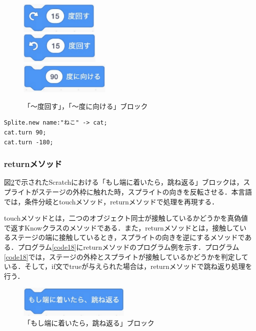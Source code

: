 \documentclass[10pt,a4j]{ltjsarticle}
\begin{document}
\begin{figure}[H]
  \centering
  \includegraphics[height=15mm]{images/turn_right.pdf} \\
  \includegraphics[height=15mm]{images/turn_left.pdf} \\
  \includegraphics[height=15mm]{images/turn.pdf}
  \caption{「〜度回す」，「〜度に向ける」ブロック}
  \label{fig:turn}
\end{figure}

\begin{lstlisting}[caption=turnメソッドのプログラム例, label=code17]
Splite.new name:"ねこ" -> cat;
cat.turn 90;
cat.turn -180; 
\end{lstlisting}

\subsubsection{returnメソッド}
図\ref{fig:return}で示されたScratchにおける「もし端に着いたら，跳ね返る」ブロックは，スプライトがステージの外枠に触れた時，スプライトの向きを反転させる．本言語では，条件分岐とtouchメソッド，returnメソッドで処理を再現する．

touchメソッドとは，二つのオブジェクト同士が接触しているかどうかを真偽値で返すKnowクラスのメソッドである．また，returnメソッドとは，接触しているステージの端に接触しているとき，スプライトの向きを逆にするメソッドである．プログラム\ref{code18}にreturnメソッドのプログラム例を示す．プログラム\ref{code18}では，ステージの外枠とスプライトが接触しているかどうかを判定している．そして，if文でtrueが与えられた場合は，returnメソッドで跳ね返り処理を行う．

\begin{figure}[H]
  \centering
  \includegraphics[height=15mm]{images/return.pdf}
  \caption{「もし端に着いたら，跳ね返る」ブロック}
  \label{fig:return}
\end{figure}
\end{document}

